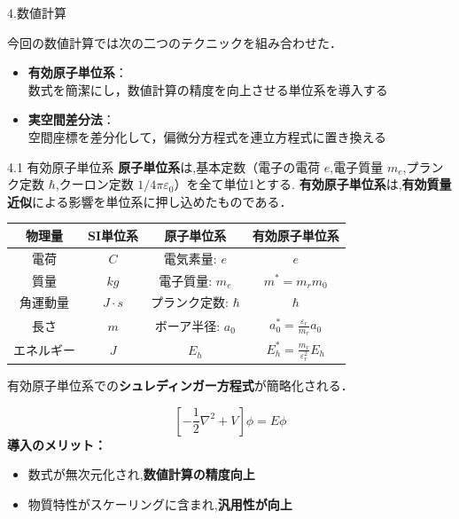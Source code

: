 \documentclass{beamer}
\begin{document}

\begin{frame}{4.数値計算}

今回の数値計算では次の二つのテクニックを組み合わせた．

\begin{itemize}
  \item \textbf{有効原子単位系}：  \\
  \rightarrow 数式を簡潔にし，数値計算の精度を向上させる単位系を導入する
  \item \textbf{実空間差分法}：  \\
  \rightarrow 空間座標を差分化して，偏微分方程式を連立方程式に置き換える
\end{itemize}
\end{frame}
  \begin{frame}{4.1 有効原子単位系}
    \textbf{原子単位系}は,基本定数（電子の電荷 $e$,電子質量 $m_e$,プランク定数 $\hbar$,クーロン定数 $1/4\pi\varepsilon_0$）を全て単位1とする.
    \textbf{有効原子単位系}は,\textbf{有効質量近似}による影響を単位系に押し込めたものである．

    \begin{center}
    {\tiny
    \begin{tabular}{|c|c|c|c|}
    \hline
    \textbf{物理量} & \textbf{SI単位系} & \textbf{原子単位系} & \textbf{有効原子単位系} \\
    \hline
    電荷 & $C$ & 電気素量: $e$ & $e$ \\
    \hline
    質量 & $kg$ & 電子質量: $m_e$ & $m^* = m_r m_0$ \\
    \hline
    角運動量 & $J\cdot s$ & プランク定数: $\hbar$ & $\hbar$ \\
    \hline
    長さ & $m$ & ボーア半径: $a_0$ & $a_0^* = \frac{\varepsilon_r}{m_r} a_0$ \\
    \hline
    エネルギー & $J$ & $E_h$ & $E_h^* = \frac{m_r}{\varepsilon_r^2} E_h$ \\
    \hline
    \end{tabular}
    }
    \end{center}
    
    


    有効原子単位系での\textbf{シュレディンガー方程式}が簡略化される．

      {\Large
      \begin{equation}
      \displaystyle
      \left[ -\frac{1}{2} \nabla^2 + V \right] \phi = E \phi
      \end{equation}
      }
      \textbf{導入のメリット：}
      \begin{itemize}
        \item 数式が無次元化され,\textbf{数値計算の精度向上}
        \item 物質特性がスケーリングに含まれ,\textbf{汎用性が向上}
      \end{itemize}
  \end{frame}  
\end{document}
